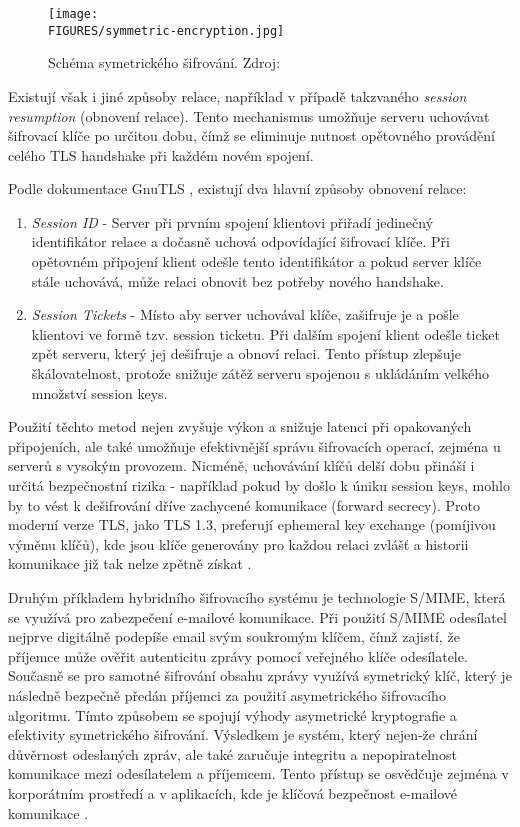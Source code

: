 \begin{figure}[htbp]
    \centering
    \texttt{[image: \\FIGURES/symmetric-encryption.jpg]}
    \caption{Schéma symetrického šifrování. Zdroj: \parencite{cloudflare2024}}
    \label{fig:symmetric-encryption}
\end{figure}

Existují však i jiné způsoby relace, například v případě takzvaného \emph{session resumption} (obnovení relace). Tento mechanismus umožňuje serveru uchovávat šifrovací klíče po určitou dobu, čímž se eliminuje nutnost opětovného provádění celého TLS handshake při každém novém spojení.

Podle dokumentace GnuTLS \textcite{gnutls2024}, existují dva hlavní způsoby obnovení relace:
\begin {enumerate}
\item \textit{Session ID} - Server při prvním spojení klientovi přiřadí jedinečný identifikátor relace a dočasně uchová odpovídající šifrovací klíče. Při opětovném připojení klient odešle tento identifikátor a pokud server klíče stále uchovává, může relaci obnovit bez potřeby nového handshake.
\item \textit{Session Tickets} - Místo aby server uchovával klíče, zašifruje je a pošle klientovi ve formě tzv. session ticketu. Při dalším spojení klient odešle ticket zpět serveru, který jej dešifruje a obnoví relaci. Tento přístup zlepšuje škálovatelnost, protože snižuje zátěž serveru spojenou s ukládáním velkého množství session keys.
\end {enumerate}

Použití těchto metod nejen zvyšuje výkon a snižuje latenci při opakovaných připojeních, ale také umožňuje efektivnější správu šifrovacích operací, zejména u serverů s vysokým provozem. Nicméně, uchovávání klíčů delší dobu přináší i určitá bezpečnostní rizika - například pokud by došlo k úniku session keys, mohlo by to vést k dešifrování dříve zachycené komunikace (forward secrecy).
Proto moderní verze TLS, jako TLS 1.3, preferují ephemeral key exchange (pomíjivou výměnu klíčů), kde jsou klíče generovány pro každou relaci zvlášť a historii komunikace již tak nelze zpětně získat \parencite {gnutls2024}. 

Druhým příkladem hybridního šifrovacího systému je technologie S/MIME, která se využívá pro zabezpečení e-mailové komunikace. Při použití S/MIME odesílatel nejprve digitálně podepíše email svým soukromým klíčem, čímž zajistí, že příjemce může ověřit autenticitu zprávy pomocí veřejného klíče odesílatele. Současně se pro samotné šifrování obsahu zprávy využívá symetrický klíč, který je následně bezpečně předán příjemci za použití asymetrického šifrovacího algoritmu. Tímto způsobem se spojují výhody asymetrické kryptografie a efektivity symetrického šifrování.
Výsledkem je systém, který nejen-že chrání důvěrnost odeslaných zpráv, ale také zaručuje integritu a nepopiratelnost komunikace mezi odesílatelem a příjemcem. Tento přístup se osvědčuje zejména v korporátním prostředí a v aplikacích, kde je klíčová bezpečnost e-mailové komunikace \parencite{cloudflare2024}.


\newpage